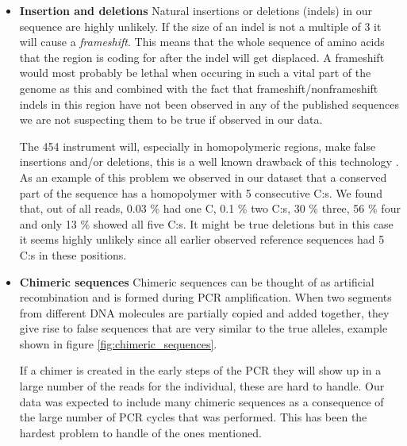 \documentclass[a4paper,11pt]{kth-mag}
\begin{document}
\begin{itemize}
	\item \textbf{Insertion and deletions}
	Natural insertions or deletions (indels) in our sequence are highly unlikely. If the size of an indel is not a multiple of 3 it will cause a \emph{frameshift}. This means that the whole sequence of amino acids that the region is coding for after the indel will get displaced. A frameshift would most probably be lethal when occuring in such a vital part of the genome as this and combined with the fact that frameshift/nonframeshift indels in this region have not been observed in any of the published sequences we are not suspecting them to be true if observed in our data.
	
The 454 instrument will, especially in homopolymeric regions, make false insertions and/or deletions, this is a well known drawback of this technology \cite{454_problems}. As an example of this problem we observed in our dataset that a conserved part of the sequence has a homopolymer with 5 consecutive C:s. We found that, out of all reads, 0.03 \% had one C, 0.1 \% two C:s, 30 \% three, 56 \% four and only 13 \% showed all five C:s.	It might be true deletions but in this case it seems highly unlikely since all earlier observed reference sequences had 5 C:s in these positions.
	  
	\item \textbf{Chimeric sequences}
	Chimeric sequences can be thought of as artificial recombination and is formed during PCR amplification. When two segments from different {DNA} molecules are partially copied and added together, they give rise to false sequences that are very similar to the true alleles, example shown in figure \ref{fig:chimeric_sequences}.
	
If a chimer is created in the early steps of the PCR they will show up in a large number of the reads for the individual, these are hard to handle. Our data was expected to include many chimeric sequences as a consequence of the large number of PCR cycles that was performed. This has been the hardest problem to handle of the ones mentioned.


\end{itemize}
\end{document}
